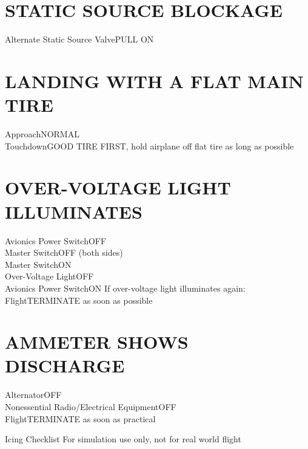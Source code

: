 \documentclass{article}
\begin{document}
\begin{multicols*}{2}
\section*{STATIC SOURCE BLOCKAGE}
Alternate Static Source Valve\dotfill PULL ON
\section*{LANDING WITH A FLAT MAIN TIRE}
Approach\dotfill NORMAL\\
Touchdown\dotfill GOOD TIRE FIRST, hold airplane off flat tire as long as possible
\section*{OVER-VOLTAGE LIGHT ILLUMINATES}
Avionics Power Switch\dotfill OFF\\
Master Switch\dotfill OFF (both sides)\\
Master Switch\dotfill ON\\
Over-Voltage Light\dotfill OFF\\
Avionics Power Switch\dotfill ON
If over-voltage light illuminates again:
Flight\dotfill TERMINATE as soon as possible
\section*{AMMETER SHOWS DISCHARGE}
Alternator\dotfill OFF\\
Nonessential Radio/Electrical Equipment\dotfill OFF\\
Flight\dotfill TERMINATE as soon as practical
\end{multicols*}
\newpage
\centering
{\fontsize{20.74}{70}\selectfont Icing Checklist}
\break
\color{Red}
{\fontsize{10}{70}\selectfont For simulation use only, not for real world flight}
\color{Black}
\end{document}
